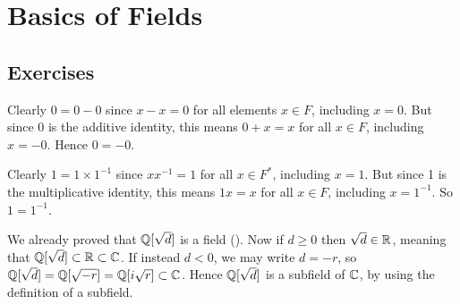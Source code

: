 \section{Basics of Fields}
\subsection*{Exercises}
\begin{questions}
    \item \begin{partquestions}{\alph*}
        \item Clearly $0 = 0 - 0$ since $x - x = 0$ for all elements $x \in F$, including $x = 0$. But since 0 is the additive identity, this means $0 + x = x$ for all $x \in F$, including $x = -0$. Hence $0 = -0$.
        \item Clearly $1 = 1\times 1^{-1}$ since $xx^{-1} = 1$ for all $x \in F^\ast$, including $x = 1$. But since 1 is the multiplicative identity, this means $1x = x$ for all $x \in F$, including $x = 1^{-1}$. So $1 = 1^{-1}$.
    \end{partquestions}

    \item We already proved that $\mathbb{Q}[\sqrt{d}]$ is a field (). Now if $d \geq 0$ then $\sqrt{d} \in \mathbb{R}$, meaning that $\mathbb{Q}[\sqrt{d}] \subset \mathbb{R} \subset \mathbb{C}$. If instead $d < 0$, we may write $d = -r$, so $\mathbb{Q}[\sqrt{d}] = \mathbb{Q}[\sqrt{-r}] = \mathbb{Q}[i\sqrt{r}] \subset \mathbb{C}$. Hence $\mathbb{Q}[\sqrt{d}]$ is a subfield of $\mathbb{C}$, by using the definition of a subfield.
\end{questions}

